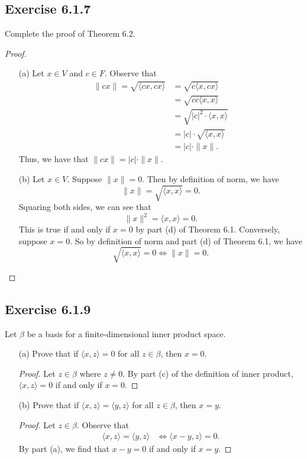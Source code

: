 \subsection*{Exercise 6.1.7} Complete the proof of Theorem 6.2.
\begin{proof}
\begin{enumerate}
    \item[(a)] Let \( x \in V  \) and \( c \in F  \). Observe that
        \begin{align*}
            \| cx \| = \sqrt{ \langle  cx , cx \rangle }  
                   &= \sqrt{c \langle x , cx \rangle }  \\
                   &= \sqrt{ c \overline{c} \langle x , x \rangle } \\
                   &= \sqrt{ | c |^{2} \cdot \langle x , x \rangle } \\
                   &= | c |  \cdot \sqrt{ \langle x , x \rangle } \\
                   &= | c |  \cdot \| x \|.
        \end{align*}
        Thus, we have that \( \| cx \| = | c  |  \cdot \| x \| \).
    \item[(b)] Let \( x \in V  \). Suppose \( \| x \| = 0   \). Then by definition of norm, we have
        \[ \| x \| = \sqrt{ \langle x , x \rangle } = 0. \]
        Squaring both sides, we can see that 
        \[  \| x \|^{2} = \langle  x , x \rangle = 0. \]
        This is true if and only if \( x = 0  \) by part (d) of Theorem 6.1. Conversely, suppose \( x = 0   \). So by definition of norm and part (d) of Theorem 6.1, we have  
        \[  \sqrt{ \langle x , x \rangle }  = 0 \iff \| x \| = 0. \]
\end{enumerate}
\end{proof}

\subsection*{Exercise 6.1.9}\label{Exercise 6.1.9} Let \( \beta \) be a basis for a finite-dimensional inner product space.
\begin{enumerate}
    \item[(a)] Prove that if \( \langle x , z \rangle = 0  \) for all \( z \in \beta  \), then \( x = 0  \).
        \begin{proof}
            Let \( z \in \beta  \) where \( z \neq 0  \). By part (c) of the definition of inner product, \( \langle x , z \rangle = 0  \) if and only if \( x = 0  \).
        \end{proof}
    \item[(b)] Prove that if \( \langle x , z \rangle = \langle y , z \rangle \) for all \( z \in \beta  \), then \( x = y  \).
        \begin{proof}
        Let \( z \in \beta  \). Observe that
        \begin{align*}
            \langle x , z \rangle = \langle y , z \rangle &\iff \langle  x - y  , z  \rangle = 0.
        \end{align*}
        By part (a), we find that \( x - y = 0  \) if and only if \( x = y  \).
        \end{proof}
\end{enumerate}

